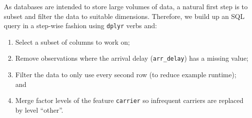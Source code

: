 As databases are intended to store large volumes of data, a natural
first step is to subset and filter the data to suitable dimensions.
Therefore, we build up an SQL query in a step-wise fashion using
\texttt{dplyr} verbs and:

\begin{enumerate}
\def\labelenumi{\arabic{enumi}.}
\tightlist
\item
  Select a subset of columns to work on;
\item
  Remove observations where the arrival delay (\texttt{arr\_delay}) has
  a missing value;
\item
  Filter the data to only use every second row (to reduce example
  runtime); and
\item
  Merge factor levels of the feature \texttt{carrier} so infrequent
  carriers are replaced by level ``other''.
\end{enumerate}

\begin{Shaded}
\begin{Highlighting}[]
\OtherTok{=} \NormalTok{(}\NormalTok{, }\NormalTok{, }\NormalTok{, }\NormalTok{, }\NormalTok{, }\NormalTok{, }\NormalTok{,}
  \NormalTok{, }\NormalTok{, }\NormalTok{, }\NormalTok{, }\NormalTok{, }\NormalTok{)}
\OtherTok{=} 

\OtherTok{=} \SpecialCharTok{!}

\OtherTok{=} \SpecialCharTok{\%\%}  \SpecialCharTok{==} \NormalTok{)}

\OtherTok{=} \NormalTok{(}\NormalTok{, }\NormalTok{, }\NormalTok{, }\NormalTok{, }\NormalTok{, }\NormalTok{, }\NormalTok{, }\NormalTok{)}
\OtherTok{=}  \NormalTok{(}
\SpecialCharTok{\textasciitilde{}} \NormalTok{,}
   \SpecialCharTok{\textasciitilde{}}
\end{Highlighting}
\end{Shaded}

